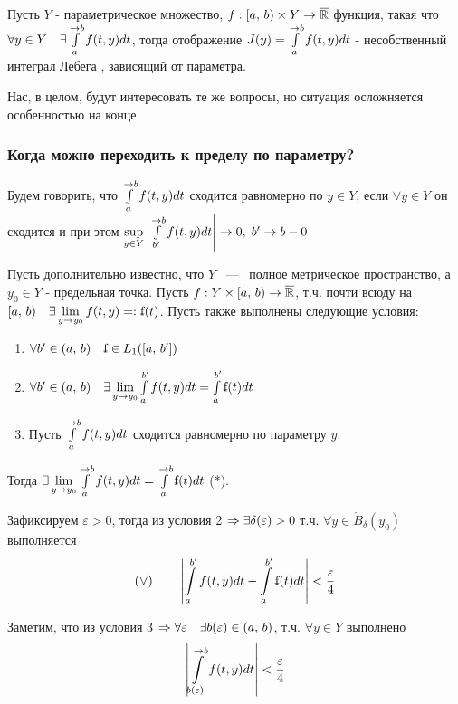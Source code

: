  Пусть $Y$ - параметрическое множество, $f : [a, \, b) \times Y \rightarrow \overline{\mathbb{R}}$ функция, такая что $\forall y \in Y \quad \exists \int\limits^{\rightarrow b}_a f(t, y) d t$, тогда отображение $J(y) = \int\limits_a^{\rightarrow b} f(t, y) d t$ - несобственный интеграл Лебега , зависящий от параметра.

Нас, в целом, будут интересовать те же вопросы, но ситуация осложняется особенностью на конце.

\subsubsection{Когда можно переходить к пределу по параметру?}

 Будем говорить, что $\int\limits^{\rightarrow b}_{a} f(t, y) dt$ сходится равномерно по $y \in Y$, если $\forall y \in Y$ он сходится и при этом $\sup\limits_{y \in Y} \left| \int\limits^{\rightarrow b}_{b'} f(t, y) dt \right| \rightarrow 0, \; b' \rightarrow b - 0$

\theorem Пусть дополнительно известно, что $Y$ ~---~ полное метрическое пространство, а $y_0 \in Y$ - предельная точка. Пусть $f : Y \times [a, \, b) \rightarrow \overline{\mathbb{R}}$, т.ч. почти всюду на $[a, \, b) \quad \exists \lim\limits_{y \ra y_0}f(t, y) =: \ff(t)$. Пусть также выполнены следующие условия:
\begin{enumerate}
    \item $\forall b' \in (a, \, b) \quad \ff \in L_1([a, \, b'])$
    \item $\forall b' \in (a, \, b) \quad \exists\lim\limits_{y \ra y_0} \int\limits^{b'}_a f(t, y) dt = \int\limits^{b'}_a \ff(t) dt$
    \item Пусть $\int\limits_a^{\rightarrow b} f(t, y) dt$ сходится равномерно по параметру $y$. 
\end{enumerate}


Тогда $\exists \lim\limits_{y \ra y_0} \int \limits^{\ra b}_a f(t, y) dt = \int\limits^{\ra b}_{a} \ff(t)dt$ (*).

\proof Зафиксируем $\varepsilon > 0$, тогда из условия 2 $\Rightarrow \exists\delta(\varepsilon) > 0$  т.ч. $\forall y \in \mathring{B}_\delta (y_0)$ выполняется
$$(\vee) \qquad \left| \int\limits_a^{b'}f(t, y) dt - \int\limits_a^{b'}\ff(t) dt \right| < \frac{\varepsilon}{4}$$

Заметим, что из условия 3 $\Rightarrow \forall \varepsilon \quad \exists b(\varepsilon) \in (a, \, b)$, т.ч. $\forall y \in Y$ выполнено
$$\left| \int\limits_{b(\varepsilon)}^{\rightarrow b} f(t, y) dt \right| < \frac{\varepsilon}{4}$$

